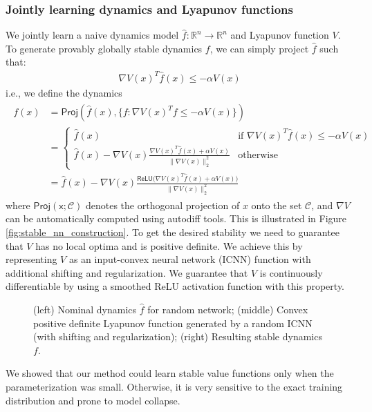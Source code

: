 \documentclass[11pt]{article}
\begin{document}
\subsubsection{Jointly learning dynamics and Lyapunov functions}
We jointly learn a naive dynamics model $\hat f: \mathbb{R}^n \to \mathbb{R}^n$ and Lyapunov function $V$. To generate provably globally stable dynamics $f$, we can simply project $\hat f$ such that:
\begin{align}
    \nabla V(x)^T \hat{f}(x) \leq -\alpha V(x)
\end{align}
i.e., we define the dynamics
\begin{align}
\label{eq:dynamics}
    \begin{split}
    f(x) & =  \mathsf{Proj}\left(\hat{f}(x), \{f: \nabla V(x)^T f \leq -\alpha V(x)\}\right ) \\
    & = \begin{cases} \hat{f}(x) & \mbox{if } \nabla V(x)^T \hat{f}(x) \leq -\alpha V(x) \\
    \hat{f}(x) - \nabla V(x)\frac{\nabla V(x)^T \hat{f}(x) + \alpha V (x)}{\|\nabla V(x)\|_2^2}    
         & \mbox{otherwise} \end{cases} \\
    & = \hat{f}(x) - \nabla V(x)\frac{\mathsf{ReLU}\bigl(\nabla V(x)^T \hat{f}(x) + \alpha V (x) \bigr)}{\|\nabla V(x)\|_2^2}    
 \end{split}
\end{align}
where $\mathsf{Proj(x;\mathcal{C})}$ denotes the orthogonal projection of $x$ onto the set $\mathcal{C}$, and $\nabla V$ can be automatically computed using autodiff tools. This is illustrated in Figure \ref{fig:stable_nn_construction}.
To get the desired stability we need to guarantee that $V$ has no local optima and is positive definite. We achieve this by representing $V$ as an input-convex neural network (ICNN) function \citep{amos2017input} with additional shifting and regularization. We guarantee that $V$ is continuously differentiable by using a smoothed ReLU activation function with this property.

\begin{figure}
  
  \caption{(left) Nominal dynamics $\hat{f}$ for random network; (middle) Convex positive definite Lyapunov function generated by a random ICNN (with shifting and regularization); (right) Resulting stable dynamics $f$. }
  \label{fig:nominal_dynamics}
\end{figure}


We showed that our method could learn stable value functions only when the parameterization was small. Otherwise, it is very sensitive to the exact training distribution and prone to model collapse.
\end{document}

